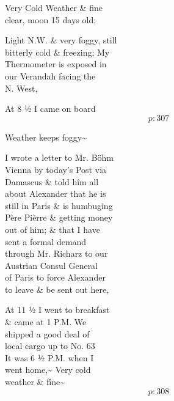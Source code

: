 \documentclass{report}
\begin{document}
	\par{
 	Very Cold Weather \& fine\ \\clear, moon 15 days old;\ \\
	}

	\par{
 	Light N.W. \& very foggy, still\ \\bitterly cold \& freezing; My\ \\Thermometer is exposed in\ \\our Verandah facing the\ \\N. West,\ \\
	}

	\par{
 	At 8 ½ I came on board\ \\
  \[p: 307 \]

	}


	\par{
 	Weather keeps foggy\~{}\ \\
	}

	\par{
 	I wrote a letter to Mr. Böhm\ \\Vienna by today’s Post via\ \\Damascus \& told hîm all\ \\about Alexander that he is\ \\still in Paris \& is humbuging\ \\Père Pièrre \& getting money\ \\out of him; \& that I have\ \\sent a formal demand\ \\through Mr. Richarz to our\ \\Austrian Consul General\ \\of Paris to force Alexander\ \\to leave \& be sent out here,\ \\
	}

	\par{
 	At 11 ½ I went to breakfast\ \\\& came at 1 P.M. We\ \\shipped a good deal of\ \\local cargo up to No. 63\ \\It was 6 ½ P.M. when I\ \\went home,\~{} Very cold\ \\weather \& fîne\~{}\ \\
  \[p: 308 \]

	}
\end{document}
